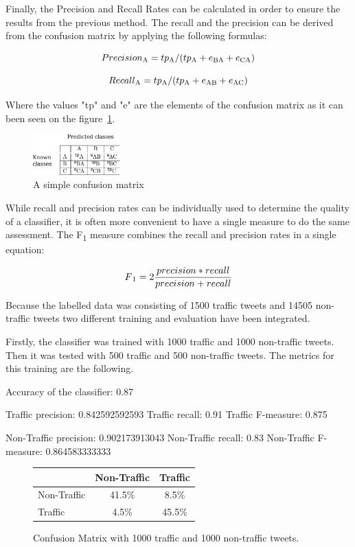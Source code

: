 Finally, the Precision and Recall Rates can be calculated in order to ensure the results from the previous method. The recall and the precision can be derived from the confusion matrix by applying the following formulas:

\[ Precision\textsubscript{A} = tp\textsubscript{A}/(tp\textsubscript{A}+e\textsubscript{BA}+e\textsubscript{CA}) \]

\[ Recall\textsubscript{A} = tp\textsubscript{A}/(tp\textsubscript{A}+e\textsubscript{AB}+e\textsubscript{AC}) \]

Where the values "tp" and "e" are the elements of the confusion matrix as it can been seen on the figure~\ref{fig:confisionMatixCalc}.

\begin{figure}[h]
    \centering
    \includegraphics[width=0.3\textwidth]{images/methodology/confusionMatrixCalc.pdf}
    \caption{A simple confusion matrix}
    \label{fig:confisionMatixCalc}
\end{figure}

While recall and precision rates can be individually used to determine the quality of a classifier, it is often more convenient to have a single measure to do the same assessment. The F\textsubscript{1} measure combines the recall and precision rates in a single equation:

\[ F\textsubscript{1} = 2\frac{precision*recall}{precision+recall} \]

Because the labelled data was consisting of 1500 traffic tweets and 14505 non-traffic tweets two different training and evaluation have been integrated. 

Firstly, the classifier was trained with 1000 traffic and 1000 non-traffic tweets. Then it was tested with 500 traffic and 500 non-traffic tweets. The metrics for this training are the following. 

Accuracy of the classifier:   0.87

Traffic precision:            0.842592592593
Traffic recall:               0.91
Traffic F-measure:            0.875

Non-Traffic precision:        0.902173913043
Non-Traffic recall:           0.83
Non-Traffic F-measure:        0.864583333333

\begin{figure}[h]
\begin{center}
    \begin{tabular}{| l || c | c | }
    \hline
          & Non-Traffic & Traffic \\ \hline \hline
         Non-Traffic & 41.5\% & 8.5\% \\ \hline
         Traffic & 4.5\% & 45.5\% \\ \hline
    \end{tabular}
    \caption{Confusion Matrix with 1000 traffic and 1000 non-traffic tweets.}
    \label{fig:confusionMatrix1}
\end{center}
\end{figure}	

